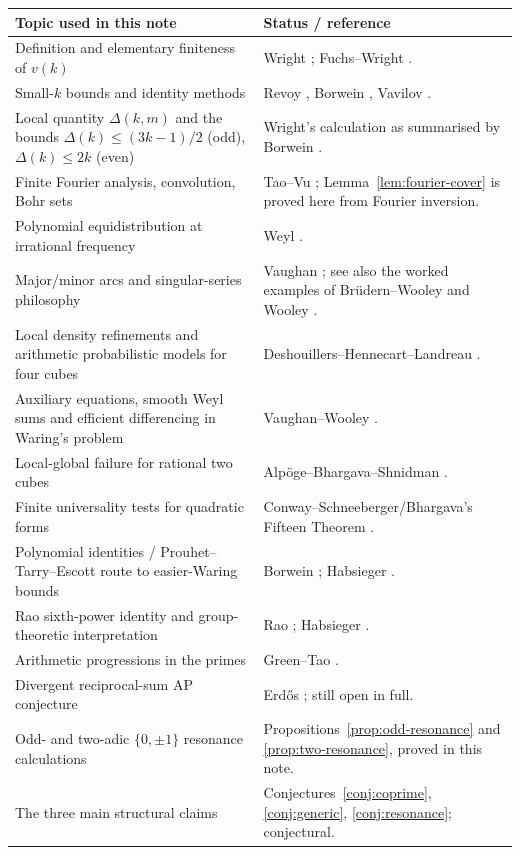 \documentclass[../Axiomathic.tex]{subfiles}
\begin{document}
\begin{center}
\begin{tabularx}{0.96\textwidth}{p{}X}
\toprule
Topic used in this note & Status / reference \\
\midrule
Definition and elementary finiteness of $v(k)$ & Wright \cite{Wright1934}; Fuchs--Wright \cite{FuchsWright1939}. \\
Small-$k$ bounds and identity methods & Revoy \cite{Revoy1991}, Borwein \cite{Borwein2002}, Vavilov \cite{Vavilov2022}. \\
Local quantity $\Delta(k,m)$ and the bounds $\Delta(k)\le(3k-1)/2$ (odd), $\Delta(k)\le2k$ (even) & Wright's calculation as summarised by Borwein \cite[Sec.~4.1]{Borwein2002}. \\
Finite Fourier analysis, convolution, Bohr sets & Tao--Vu \cite{TaoVu2006}; Lemma~\ref{lem:fourier-cover} is proved here from Fourier inversion. \\
Polynomial equidistribution at irrational frequency & Weyl \cite{Weyl1916}. \\
Major/minor arcs and singular-series philosophy & Vaughan \cite{Vaughan1997}; see also the worked examples of Br\"udern--Wooley \cite{BruedernWooley2001} and Wooley \cite{WooleyTwoSquares}. \\
Local density refinements and arithmetic probabilistic models for four cubes & Deshouillers--Hennecart--Landreau \cite{Deshouillers1999}. \\
Auxiliary equations, smooth Weyl sums and efficient differencing in Waring's problem & Vaughan--Wooley \cite{VaughanWooley1994}. \\
Local-global failure for rational two cubes & Alp\"oge--Bhargava--Shnidman \cite{AlpogeBhargavaShnidman}. \\
Finite universality tests for quadratic forms & Conway--Schneeberger/Bhargava's Fifteen Theorem \cite{Conway2000,Bhargava2000}. \\
Polynomial identities / Prouhet--Tarry--Escott route to easier-Waring bounds & Borwein \cite{Borwein2002}; Habsieger \cite{Habsieger1991}. \\
Rao sixth-power identity and group-theoretic interpretation & Rao \cite{Rao1938}; Habsieger \cite{Habsieger1991}. \\
Arithmetic progressions in the primes & Green--Tao \cite{GreenTao2008}. \\
Divergent reciprocal-sum AP conjecture & Erd\H{o}s \cite{Erdos1980}; still open in full. \\
Odd- and two-adic $\{0,\pm1\}$ resonance calculations & Propositions~\ref{prop:odd-resonance} and \ref{prop:two-resonance}, proved in this note. \\
The three main structural claims & Conjectures~\ref{conj:coprime}, \ref{conj:generic}, \ref{conj:resonance}; conjectural. \\
\bottomrule
\end{tabularx}
\end{center}
\end{document}
